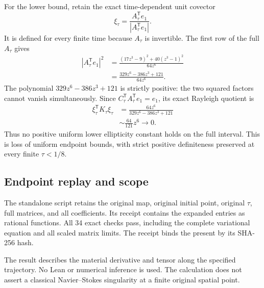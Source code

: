 For the lower bound, retain the exact time-dependent unit covector
\[
\xi_\tau=\frac{A_\tau^{\mathsf T}e_1}
 {|A_\tau^{\mathsf T}e_1|}.
\]
It is defined for every finite time because \(A_\tau\) is invertible.
The first row of the full \(A_\tau\) gives
\[
\begin{aligned}
|A_\tau^{\mathsf T}e_1|^2
&=\frac{(17z^3-9)^2+40(z^3-1)^2}{64z^6}\\
&=\frac{329z^6-386z^3+121}{64z^6}.
\end{aligned}
\]
The polynomial \(329z^6-386z^3+121\) is strictly positive: the two
squared factors cannot vanish simultaneously. Since
\(C_\tau^{\mathsf T}A_\tau^{\mathsf T}e_1=e_1\), its exact Rayleigh
quotient is
\[
\begin{aligned}
\xi_\tau^{\mathsf T}K_\tau\xi_\tau
&=\frac{64z^6}{329z^6-386z^3+121}\\
&\sim\frac{64}{121}z^6\longrightarrow0.
\end{aligned}
\]
Thus no positive uniform lower ellipticity constant holds on the full
interval. This is loss of uniform endpoint bounds, with strict positive
definiteness preserved at every finite \(\tau<1/8\).

\subsection{Endpoint replay and scope}

The standalone script  retains
the original map, original initial point, original \(\tau\), full
matrices, and all coefficients. Its receipt
 contains the expanded entries
as rational functions. All 34 exact checks pass, including the complete
variational equation and all scaled matrix limits. The receipt binds
the present  by its SHA-256 hash.

The result describes the material derivative and tensor along the
specified trajectory. No Lean or numerical inference is used. The
calculation does not assert a classical Navier--Stokes singularity at a
finite original spatial point.


